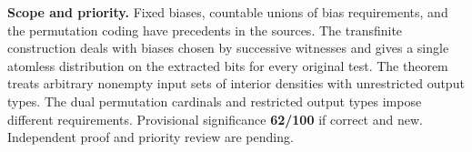 \documentclass[11pt]{article}
\begin{document}
\textbf{Scope and priority.} Fixed biases, countable unions of bias requirements, and the permutation coding have precedents in the sources. The transfinite construction deals with biases chosen by successive witnesses and gives a single atomless distribution on the extracted bits for every original test. The theorem treats arbitrary nonempty input sets of interior densities with unrestricted output types. The dual permutation cardinals and restricted output types impose different requirements. Provisional significance \textbf{62/100} if correct and new. Independent proof and priority review are pending.
\end{document}
